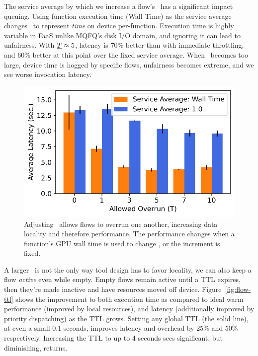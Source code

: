 The service average by which we increase a flow's \VT~has a significant impact queuing.
Using function execution time (Wall Time) as the service average changes \VT~to represent \emph{time} on device per-function.
Execution time is highly variable in FaaS unlike MQFQ's disk I/O domain, and ignoring it can lead to unfairness.
With $\emph{T} \approx 5$, latency is 70\% better than with immediate throttling, and 60\% better at this point over the fixed service average.
When \T~becomes too large, device time is hogged by specific flows, unfairness becomes extreme, and we see worse invocation latency.

\begin{figure}
  \centering
  \includegraphics{mqfq/graphs/unfairness/25.7/e2e_sec.pdf}
  \caption{Adjusting \T~allows flows to overrun one another, increasing data locality and therefore performance.
  The performance changes when a function's GPU wall time is used to change \VT, or the increment is fixed.}
    \label{fig:unfairness-queue}
\end{figure}

A larger \T~is not the only way tool design has to favor locality, we can also keep a flow \emph{active} even while empty.
Empty flows remain active until a TTL expires, then they're made inactive and have resources moved off device.
Figure~\ref{fig:flow-ttl} shows the improvement to both execution time as compared to ideal warm performance (improved by local resources), and latency (additionally improved by priority dispatching) as the TTL grows.
Setting any global TTL (the solid line), at even a small 0.1 seconds, improves latency and overhead by 25\% and 50\% respectively.
Increasing the TTL to up to 4 seconds sees significant, but diminishing, returns.

